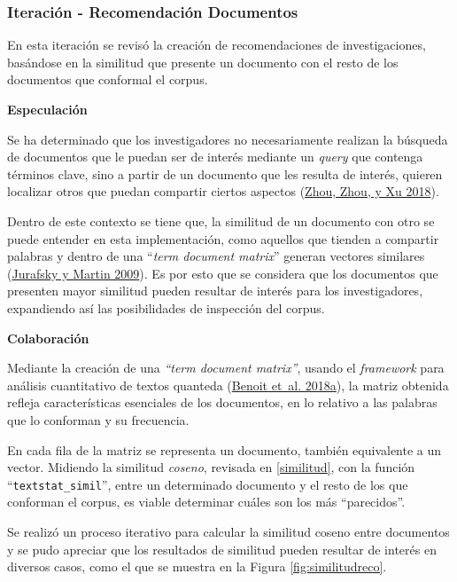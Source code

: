\documentclass[
  12pt,
  openany]{book}
\begin{document}
\hypertarget{imrecomendacion}{%
\subsubsection{Iteración - Recomendación Documentos}\label{imrecomendacion}}

En esta iteración se revisó la creación de recomendaciones de investigaciones, basándose en la similitud que presente un documento con el resto de los documentos que conformal el corpus.

\textbf{Especulación}

Se ha determinado que los investigadores no necesariamente realizan la búsqueda de documentos que le puedan ser de interés mediante un \emph{query} que contenga términos clave, sino a partir de un documento que les resulta de interés, quieren localizar otros que puedan compartir ciertos aspectos (\protect\hyperlink{ref-zhou2018}{Zhou, Zhou, y Xu 2018}).

Dentro de este contexto se tiene que, la similitud de un documento con otro se puede entender en esta implementación, como aquellos que tienden a compartir palabras y dentro de una ``\emph{term document matrix}'' generan vectores similares (\protect\hyperlink{ref-jurafsky2009}{Jurafsky y Martin 2009}). Es por esto que se considera que los documentos que presenten mayor similitud pueden resultar de interés para los investigadores, expandiendo así las posibilidades de inspección del corpus.

\textbf{Colaboración}

Mediante la creación de una \emph{``term document matrix''}, usando el \emph{framework} para análisis cuantitativo de textos quanteda (\protect\hyperlink{ref-quanteda}{Benoit et~al. 2018a}), la matriz obtenida refleja características esenciales de los documentos, en lo relativo a las palabras que lo conforman y su frecuencia.



En cada fila de la matriz se representa un documento, también equivalente a un vector. Midiendo la similitud \emph{coseno}, revisada en \ref{similitud}, con la función ``\texttt{textstat\_simil}'', entre un determinado documento y el resto de los que conforman el corpus, es viable determinar cuáles son los más ``parecidos''.

Se realizó un proceso iterativo para calcular la similitud coseno entre documentos y se pudo apreciar que los resultados de similitud pueden resultar de interés en diversos casos, como el que se muestra en la Figura \ref{fig:similitudreco}.
\end{document}

